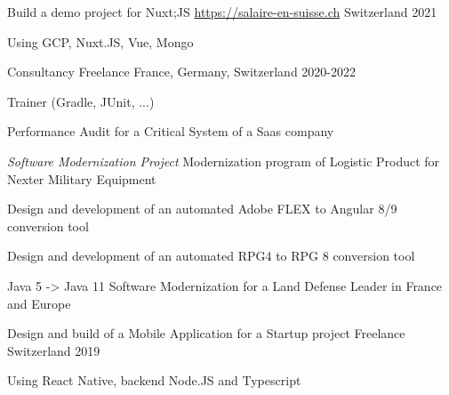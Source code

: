 

\begin{cventries}

\cventry
{Build a demo project for Nuxt;JS} %
{\url{https://salaire-en-suisse.ch}} %
{Switzerland} %
{2021} %
{
  \begin{cvitems} %
  \item {Using GCP, Nuxt.JS, Vue, Mongo}
  \end{cvitems}
}

\cventry
{Consultancy} %
{Freelance} %
{France, Germany, Switzerland} %
{2020-2022} %
{
  \begin{cvitems} %
    \item{Trainer (Gradle, JUnit, ...)}
    \item{Performance Audit for a Critical System of a Saas company}
    \item{\emph{Software Modernization Project} Modernization program of Logistic Product for Nexter Military Equipment}
    \item{Design and development of an automated Adobe FLEX to Angular 8/9 conversion tool}
    \item{Design and development of an automated RPG4 to RPG 8 conversion tool}
    \item{Java 5 -> Java 11 Software Modernization for a Land Defense Leader in France and Europe}
  \end{cvitems}
}


\cventry
{Design and build of a Mobile Application for a Startup project} %
{Freelance} %
{Switzerland} %
{2019} %
{
  \begin{cvitems} %
  \item {Using React Native, backend Node.JS and Typescript}
  \end{cvitems}
}


\end{cventries}
